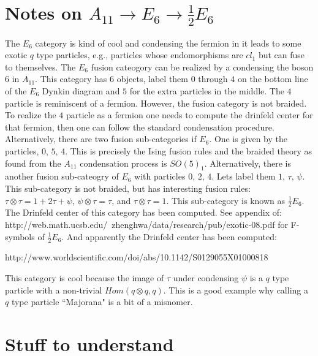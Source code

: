 \documentclass[12pt,a4paper]{article}
\begin{document}
\section{Notes on $A_{11} \rightarrow E_6 \rightarrow \frac{1}{2} E_6$}
The $E_6$ category is kind of cool and condensing the fermion in it leads to some exotic $q$ type particles, e.g., particles whose endomorphisms are $cl_1$ but can fuse to themselves. 
The $E_6$ fusion cateogory can be realized by a condensing the boson $6$ in $A_{11}$. 
This category has $6$ objects, label them $0$ through $4$ on the bottom line of the $E_6$ Dynkin diagram and $5$ for the extra particles in the middle. 
The $4$ particle is reminiscent of a fermion. 
However, the fusion category is not braided. 
To realize the $4$ particle as a fermion one needs to compute the drinfeld center for that fermion, then one can follow the standard condensation procedure.
Alternatively, there are two fusion sub-categories if $E_6$. 
One is given by the particles, $0$, $5$, $4$. 
This is precisely the Ising fusion rules and the braided theory as found from the $A_{11}$ condensation process is $SO(5)_1$.
Alternatively, there is another fusion sub-cateogry of $E_6$ with particles $0$, $2$, $4$. Lets label them $1$, $\tau$, $\psi$. 
This sub-category is not braided, but has interesting fusion rules: $\tau \otimes \tau = 1+ 2\tau + \psi$, $\psi \otimes \tau = \tau$, and $\tau \otimes \tau = 1$. 
This sub-category is known as $\frac{1}{2}E_6$. 
The Drinfeld center of this category has been computed.
See appendix of: http://web.math.ucsb.edu/~zhenghwa/data/research/pub/exotic-08.pdf 
for F-symbols of $\frac{1}{2}E_6$. 
And apparently the Drinfeld center has been computed: 


http://www.worldscientific.com/doi/abs/10.1142/S0129055X01000818

This category is cool because the image of $\tau$ under condensing $\psi$ is a $q$ type particle with a non-trivial $Hom(q\otimes q, q)$. 
This is a good example why calling a $q$ type particle ``Majorana" is a bit of a misnomer. 

\section{Stuff to understand}
\end{document}
